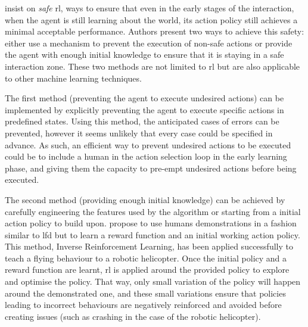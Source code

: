 	\cite{garcia2015comprehensive} insist on \textit{safe} \gls{rl}, ways to ensure that even in the early stages of the interaction, when the agent is still learning about the world, its action policy still achieves a minimal acceptable performance. Authors present two ways to achieve this safety: either use a mechanism to prevent the execution of non-safe actions or provide the agent with enough initial knowledge to ensure that it is staying in a safe interaction zone. These two methods are not limited to \gls{rl} but are also applicable to other machine learning techniques. 
	
	The first method (preventing the agent to execute undesired actions) can be implemented by explicitly preventing the agent to execute specific actions in predefined states. Using this method, the anticipated cases of errors can be prevented, however it seems unlikely that every case could be specified in advance. As such, an efficient way to prevent undesired actions to be executed could be to include a human in the action selection loop in the early learning phase, and giving them the capacity to pre-empt undesired actions before being executed. 
	
	The second method (providing enough initial knowledge) can be achieved by carefully engineering the features used by the algorithm or starting from a initial action policy to build upon. \cite{abbeel2004apprenticeship} propose to use humans demonstrations in a fashion similar to \gls{lfd} but to learn a reward function and an initial working action policy. This method, Inverse Reinforcement Learning, has been applied successfully to teach a flying behaviour to a robotic helicopter. Once the initial policy and a reward function are learnt, \gls{rl} is applied around the provided policy to explore and optimise the policy. That way, only small variation of the policy will happen around the demonstrated one, and these small variations ensure that policies leading to incorrect behaviours are negatively reinforced and avoided before creating issues (such as crashing in the case of the robotic helicopter). 
	
	
